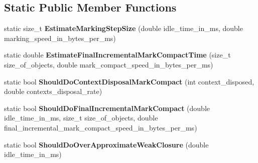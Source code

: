 \subsection*{Static Public Member Functions}
\begin{DoxyCompactItemize}
\item 
static size\+\_\+t {\bfseries Estimate\+Marking\+Step\+Size} (double idle\+\_\+time\+\_\+in\+\_\+ms, double marking\+\_\+speed\+\_\+in\+\_\+bytes\+\_\+per\+\_\+ms)\hypertarget{classv8_1_1internal_1_1_g_c_idle_time_handler_a8f4bea1cd70f253107bee82834ebf73d}{}\label{classv8_1_1internal_1_1_g_c_idle_time_handler_a8f4bea1cd70f253107bee82834ebf73d}

\item 
static double {\bfseries Estimate\+Final\+Incremental\+Mark\+Compact\+Time} (size\+\_\+t size\+\_\+of\+\_\+objects, double mark\+\_\+compact\+\_\+speed\+\_\+in\+\_\+bytes\+\_\+per\+\_\+ms)\hypertarget{classv8_1_1internal_1_1_g_c_idle_time_handler_a848df7d9be920880d7dc4585ca7f5642}{}\label{classv8_1_1internal_1_1_g_c_idle_time_handler_a848df7d9be920880d7dc4585ca7f5642}

\item 
static bool {\bfseries Should\+Do\+Context\+Disposal\+Mark\+Compact} (int context\+\_\+disposed, double contexts\+\_\+disposal\+\_\+rate)\hypertarget{classv8_1_1internal_1_1_g_c_idle_time_handler_a40c24b122dfbb935cb6372088a607d41}{}\label{classv8_1_1internal_1_1_g_c_idle_time_handler_a40c24b122dfbb935cb6372088a607d41}

\item 
static bool {\bfseries Should\+Do\+Final\+Incremental\+Mark\+Compact} (double idle\+\_\+time\+\_\+in\+\_\+ms, size\+\_\+t size\+\_\+of\+\_\+objects, double final\+\_\+incremental\+\_\+mark\+\_\+compact\+\_\+speed\+\_\+in\+\_\+bytes\+\_\+per\+\_\+ms)\hypertarget{classv8_1_1internal_1_1_g_c_idle_time_handler_ae1c8b3b8cc189a68f2e58edb3856171a}{}\label{classv8_1_1internal_1_1_g_c_idle_time_handler_ae1c8b3b8cc189a68f2e58edb3856171a}

\item 
static bool {\bfseries Should\+Do\+Over\+Approximate\+Weak\+Closure} (double idle\+\_\+time\+\_\+in\+\_\+ms)\hypertarget{classv8_1_1internal_1_1_g_c_idle_time_handler_a1fef31ad290f57911bf56f6376703e3c}{}\label{classv8_1_1internal_1_1_g_c_idle_time_handler_a1fef31ad290f57911bf56f6376703e3c}

\end{DoxyCompactItemize}
